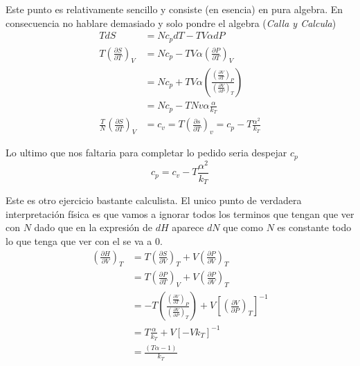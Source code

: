 \documentclass{report}
\begin{document}

\sol

Este punto es relativamente sencillo y consiste (en esencia) en pura algebra. En consecuencia no hablare demasiado y solo pondre el algebra (\textit{Calla y Calcula})
\begin{align*}
  TdS &= Nc_pdT - TV\alpha dP \\
  T \left( \frac{\partial {S}}{\partial {T}} \right)_V &= Nc_p - TV\alpha \left( \frac{\partial {P}}{\partial {T}} \right)_V \\
                                                       &= Nc_p + TV\alpha \left( \frac{\left( \frac{\partial {V}}{\partial {T}} \right)_P}{\left( \frac{\partial {V}}{\partial {P}} \right)_T}  \right)\\
                                                       &= Nc_p - TNv\alpha \frac{\alpha}{k_T} \\
  \frac{T}{N} \left( \frac{\partial {S}}{\partial {T}}\right)_V &= c_v = T \left( \frac{\partial {s}}{\partial {T}} \right)_v = c_p - T \frac{\alpha^2}{k_T} 
 \end{align*}

 Lo ultimo que nos faltaria para completar lo pedido seria despejar $c_p$\[
  c_p = c_v - T \frac{\alpha^2}{k_T} 
 \]

\sol

Este es otro ejercicio bastante calculista. El unico punto de verdadera interpretación física es que vamos a ignorar todos los terminos que tengan que ver con $N$ dado que en la expresión de $dH$ aparece $dN$ que como $N$ es constante todo lo que tenga que ver con el se va a 0.
\begin{align*}
  \left( \frac{\partial {H}}{\partial {V}} \right)_T &= T \left( \frac{\partial {S}}{\partial {V}} \right)_T + V \left( \frac{\partial {P}}{\partial {V}} \right)_T \\
                                                     &= T \left( \frac{\partial {P}}{\partial {T}}\right)_V + V \left( \frac{\partial {P}}{\partial {V}} \right)_T\\
                                                     &= -T \left( \frac{\left( \frac{\partial {V}}{\partial {T}} \right)_P}{\left( \frac{\partial {V}}{\partial {P}} \right)_T}  \right) + V \left[ \left( \frac{\partial {V}}{\partial {P}} \right)_T \right]^{-1}\\
                                                     &= T \frac{\alpha}{k_T} + V \left[ -V k_T \right]^{-1} \\
                                                     &= \frac{(T\alpha - 1)}{k_T} 
\end{align*}
\end{document}
